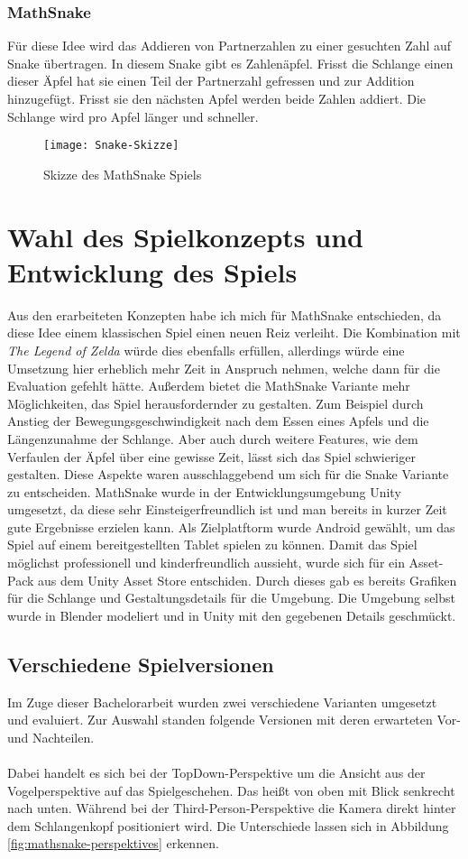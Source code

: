 \subsubsection{MathSnake}
Für diese Idee wird das Addieren von Partnerzahlen zu einer gesuchten Zahl auf Snake übertragen. In diesem Snake gibt es Zahlenäpfel. Frisst die Schlange einen dieser Äpfel hat sie einen Teil der Partnerzahl gefressen und zur Addition hinzugefügt. Frisst sie den nächsten Apfel werden beide Zahlen addiert. Die Schlange wird pro Apfel länger und schneller.
\begin{figure}[htb]
	\centering
	\texttt{[image: Snake-Skizze]}
	\caption{Skizze des MathSnake Spiels\label{fig:mathsnake}}
\end{figure}
\section{Wahl des Spielkonzepts und Entwicklung des Spiels}
Aus den erarbeiteten Konzepten habe ich mich für MathSnake entschieden, da diese Idee einem klassischen Spiel einen neuen Reiz verleiht. Die Kombination mit \textit{The Legend of Zelda} würde dies ebenfalls erfüllen, allerdings würde eine Umsetzung hier erheblich mehr Zeit in Anspruch nehmen, welche dann für die Evaluation gefehlt hätte. Außerdem bietet die MathSnake Variante mehr Möglichkeiten, das Spiel herausfordernder zu gestalten. Zum Beispiel durch Anstieg der Bewegungsgeschwindigkeit nach dem Essen eines Apfels und die Längenzunahme der Schlange. Aber auch durch weitere Features, wie dem Verfaulen der Äpfel über eine gewisse Zeit, lässt sich das Spiel schwieriger gestalten. Diese Aspekte waren ausschlaggebend um sich für die Snake Variante zu entscheiden.
MathSnake wurde in der Entwicklungsumgebung Unity umgesetzt, da diese sehr Einsteigerfreundlich ist und man bereits in kurzer Zeit gute Ergebnisse erzielen kann. Als Zielplatftorm wurde Android gewählt, um das Spiel auf einem bereitgestellten Tablet spielen zu können. Damit das Spiel möglichst professionell und kinderfreundlich aussieht, wurde sich für ein Asset-Pack aus dem Unity Asset Store entschiden. Durch dieses gab es bereits Grafiken für die Schlange und Gestaltungsdetails für die Umgebung. Die Umgebung selbst wurde in Blender modeliert und in Unity mit den gegebenen Details geschmückt.
\subsection{Verschiedene Spielversionen}
Im Zuge dieser Bachelorarbeit wurden zwei verschiedene Varianten umgesetzt und evaluiert. Zur Auswahl standen folgende Versionen mit deren erwarteten Vor- und Nachteilen.\\
\\
Dabei handelt es sich bei der TopDown-Perspektive um die Ansicht aus der Vogelperspektive auf das Spielgeschehen. Das heißt von oben mit Blick senkrecht nach unten. Während bei der Third-Person-Perspektive die Kamera direkt hinter dem Schlangenkopf positioniert wird. Die Unterschiede lassen sich in Abbildung \ref{fig:mathsnake-perspektives} erkennen.
\newpage
